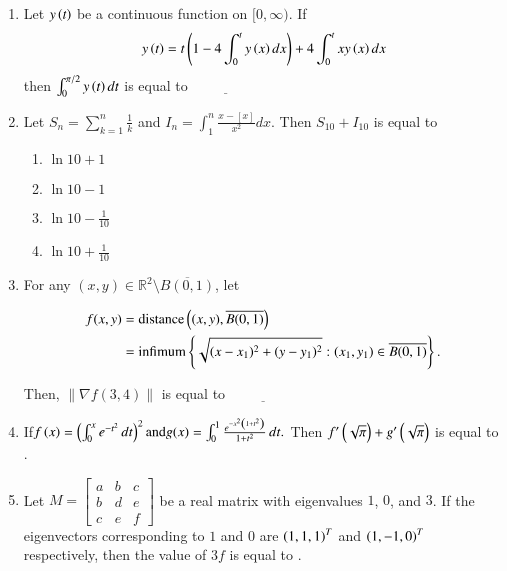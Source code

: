 \documentclass[journal]{IEEEtran}
\begin{document}
\begin{enumerate}[start=1]
\item Let $y\left(t\right)$ be a continuous function on $[0,\infty)$. If
\begin{align*}
y\left(t\right)=t\left(1-4\int_{0}^{t}y\left(x\right)dx\right)+4\int_{0}^{t}xy\left(x\right)dx
\end{align*}
then $\int_{0}^{\pi/2}y\left(t\right)dt$ is equal to  $\underline{\hspace{2cm}}$\\

\item Let $S_{n}=\sum_{k=1}^{n}\frac{1}{k}$ and $I_{n}=\int_{1}^{n}\frac{x-[x]}{x^{2}}dx$. Then $S_{10}+I_{10}$ is equal to
\begin{multicols}{2}
\begin{enumerate}
    \item $\ln 10 + 1$
    \item $\ln 10 - 1$
    \item $\ln 10 - \frac{1}{10}$
    \item $\ln 10 + \frac{1}{10}$
\end{enumerate}
\end{multicols}

\item For any $(x, y) \in \mathbb{R}^2 \setminus \overline{B(0,1)}$, let

\begin{align*}
    f(x, y) &= \text{distance}\left((x, y), \overline{B(0,1)}\right) \\
    &= \text{infimum} \left\{\sqrt{(x-x_1)^2 + (y-y_1)^2} : (x_1, y_1) \in \overline{B(0,1)}\right\}.
\end{align*}

Then, $\|\nabla f(3,4)\|$ is equal to $\underline{\hspace{2cm}}$\\

\item If$f\left(x\right) = \left(\int_0^x e^{-t^2} \, dt \right)^2 \text{and} g(x) = \int_0^1 \frac{e^{-x^2\left(1 + t^2\right)}}{1 + t^2} \, dt.$
Then $f'\left(\sqrt{\pi}\right) + g'\left(\sqrt{\pi}\right)$ is equal to \underline{\hspace{2cm}}.\\

\item Let $M = \begin{bmatrix} a & b & c \\ b & d & e \\ c & e & f \end{bmatrix}$ be a real matrix with eigenvalues $1$, $0$, and $3$. If the eigenvectors corresponding to $1$ and $0$ are $\left(1, 1, 1\right)^T$ and $\left(1, -1, 0\right)^T$ respectively, then the value of $3f$ is equal to \underline{\hspace{2cm}}.\\


\end{enumerate}
\end{document}

